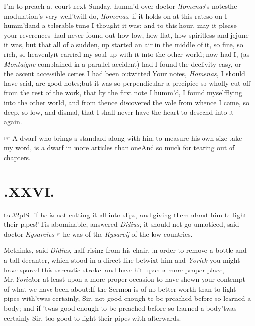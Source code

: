 \documentclass{article}
\begin{document}
I’m to preach at court next Sunday, 
humm’d over doctor \textit{Homenas}’s notes\tsk the
modulation’s very well\tsk ’twill do,
\textit{Homenas}, if it holds on at this rate\tsk so on I
humm’d\tsk and a tolerable tune I thought it was; and to
this hour, may it please your reverences, had never found
out how low, how flat, how spiritless and jejune it was, but
that all of a sudden, up started an air in the middle of it,
so fine, so rich, so heavenly\tsk it carried my soul up
with it into the other world; now had I, (as
\textit{Montaigne} complained in a parallel accident)\tsk
had I found the declivity easy, or the ascent accessible\tsk
certes I had been outwitted\break
\tsk Your notes, \textit{Homenas}, I should have said, are
good notes;\tsh but it was so perpendicular a precipice\tsk
so wholly cut off from the rest of the work, that by
the\break
first note I humm’d, I found myself\break flying into the other
world, and from thence discovered the vale from whence\break
I came, so deep, so low, and dismal,
that I shall never have
the heart to descend into it again.

☞ A dwarf who brings a standard\break
along with him to measure his own size\break
\tsk take my word, is a dwarf in more articles than
one\tsk And so much for tearing out of chapters.

\bigskip

\section{.\enspace XXVI.}

\lettrine{\hskip-3pt\hbox to 32pt{\Tsk S}}{\,\,} 
if he is not cutting it all into slips, and giving them
about him to light their pipes!\tsh ’Tis abominable,
answered \textit{Didius;} it should not go unnoticed, said
doctor \textit{Kysarcius}\tsh ☞  he was of the
\textit{Kysarcij} of the low countries.

Methinks, said \textit{Didius}, half rising\break
from his chair, in order to remove a
bottle and a tall decanter, which stood in a direct line
betwixt him and \textit{Yorick}\break
\tsk you might have spared this sarcastic stroke, and have hit upon a more proper
place, Mr.\@ \textit{Yorick}\tsk or at least upon a more
proper occasion to have shewn your contempt of what we have
been about:\break If the Sermon is of no better worth than to
light pipes with\tsk ’twas certainly, Sir, not good enough
to be preached before so learned a body; and if ’twas good
enough to be preached before so learned a body\tsk ’twas
certainly Sir, too good to light their pipes with
afterwards.
\end{document}
